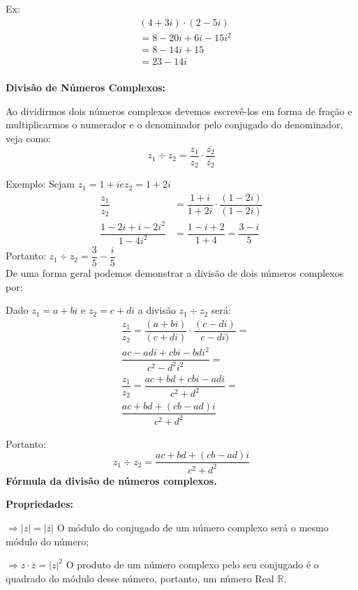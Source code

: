 \begin{multicols*}{2}
	Ex:
	\begin{align*}
		 & (4 + 3i) \cdot (2 - 5i) \\
		 & = 8 -20i + 6i - 15i^2   \\
		 & = 8 - 14i + 15          \\
		 & = 23 - 14i              \\
	\end{align*}

	\textbf{Divisão de Números Complexos:}

	Ao dividirmos dois números complexos devemos escrevê-los em forma de fração e multiplicarmos o numerador e o denominador pelo conjugado do denominador, veja como:
	\[ z_1 \div z_2  =  \dfrac{z_1}{z_2} \cdot \dfrac{\overline{z_2}}{\overline{z_2}} \]

	Exemplo: Sejam $ z_1 = 1 + i   e  z_2 = 1 +2i $
	\begin{align*}
		\dfrac{z_1}{z_2}                   & = \dfrac{1 + i}{1 + 2i} \cdot \dfrac{(1 - 2i)}{(1 - 2i)} \\[2ex]
		\dfrac{1 - 2i + i -2i^2}{1 - 4i^2} & = \dfrac{1 - i + 2}{1 +4} = \dfrac{3 - i}{5}
	\end{align*}
	Portanto:  $z_1 \div z_2 = \dfrac{3}{5} - \dfrac{i}{5}$\\

	De uma forma geral podemos demonstrar a divisão de dois números complexos por:

	Dado $z_1 = a + bi$ e $z_2 = c + di$ a divisão $z_1 \div z_2$ será:
	\begin{align*}
		 & \dfrac{z_1}{z_2} = \dfrac{(a + bi)}{(c + di)} \cdot \dfrac{(c - di)}{c - di)} = \\[2ex]
		 & \dfrac{ac - adi + cbi - bdi^2}{c^2 - d^2i^2} =                                  \\[2ex]
		 & \dfrac{z_1}{z_2}= \dfrac{ac + bd + cbi - adi}{c^2 + d^2}=                       \\[2ex]
		 & \dfrac{ac + bd + (cb - ad)i}{c^2 + d^2}
	\end{align*}

	Portanto:
	\[z_1 \div z_2 = \dfrac{ac + bd + (cb - ad)i}{c^2 + d^2}\]
	\textbf{Fórmula da divisão de números complexos.}

	\textbf{Propriedades:}

	$\Rightarrow |z| = |\overline{z}| $ O módulo do conjugado de um número complexo será o mesmo módulo do número;

	$\Rightarrow z \cdot \overline{z} = |z|^2 $ O produto de um número complexo pelo seu conjugado é o quadrado do módulo desse número, portanto, um número Real $\mathbb{R}.$


\end{multicols*}
